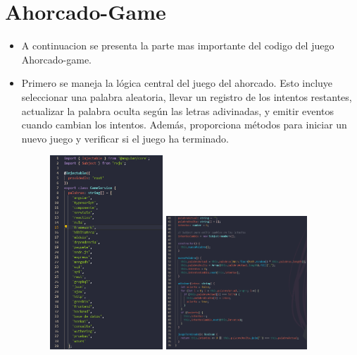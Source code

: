 \documentclass{article}
\begin{document}
	\section{Ahorcado-Game}
	\begin{itemize}
		\item A continuacion se presenta la parte mas importante del codigo del juego Ahorcado-game.
		\item Primero se maneja la lógica central del juego del ahorcado. Esto incluye seleccionar una palabra aleatoria, llevar un registro de los intentos restantes, actualizar la palabra oculta según las letras adivinadas, y emitir eventos cuando cambian los intentos. Además, proporciona métodos para iniciar un nuevo juego y verificar si el juego ha terminado.
		
		\begin{figure}[H]
			\centering
			\includegraphics[width=0.4\textwidth,keepaspectratio]{img/game1.png}
			\includegraphics[width=0.5\textwidth,keepaspectratio]{img/game2.png}
		\end{figure}
		

\end{itemize}
\end{document}
